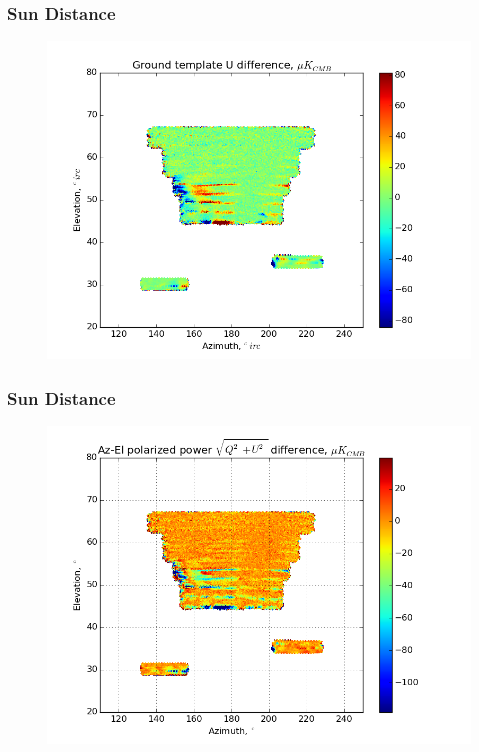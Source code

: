 \documentclass{beamer}
\begin{document}
\begin{frame}
\frametitle{Sun Distance}
\begin{figure}
\includegraphics[width=0.9\linewidth]{dU_gt_SUN_DIST.png}
\end{figure}
\end{frame}

\begin{frame}
\frametitle{Sun Distance}
\begin{figure}
\includegraphics[width=0.9\linewidth]{dMag_gt_SUN_DIST.png}
\end{figure}
\end{frame}
\end{document}
